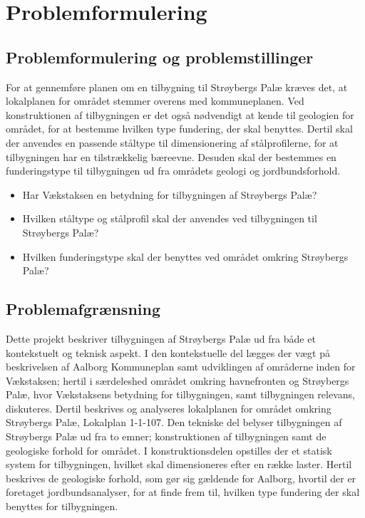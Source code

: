 \chapter{Problemformulering}

\section{Problemformulering og problemstillinger}
For at gennemføre planen om en tilbygning til Strøybergs Palæ kræves det, at lokalplanen for området stemmer overens med kommuneplanen. Ved konstruktionen af tilbygningen er det også nødvendigt at kende til geologien for området, for at bestemme hvilken type fundering, der skal benyttes. Dertil skal der anvendes en passende ståltype til dimensionering af stålprofilerne, for at tilbygningen har en tilstrækkelig bæreevne. Desuden skal der bestemmes en funderingstype til tilbygningen ud fra områdets geologi og jordbundsforhold. 

\begin{itemize} 
	\item Har Vækstaksen en betydning for tilbygningen af Strøybergs Palæ?
	\item Hvilken ståltype og stålprofil skal der anvendes ved tilbygningen til Strøybergs Palæ? 
	\item Hvilken funderingstype skal der benyttes ved området omkring Strøybergs Palæ? 
\end{itemize} 

\section{Problemafgrænsning}
Dette projekt beskriver tilbygningen af Strøybergs Palæ ud fra både et kontekstuelt og teknisk aspekt. I den kontekstuelle del lægges der vægt på beskrivelsen af Aalborg Kommuneplan samt udviklingen af områderne inden for Vækstaksen; hertil i særdeleshed området omkring havnefronten og Strøybergs Palæ, hvor Vækstaksens betydning for tilbygningen, samt tilbygningen relevans, diskuteres. Dertil beskrives og analyseres lokalplanen for området omkring Strøybergs Palæ, Lokalplan 1-1-107.
\newline \indent{     }  Den tekniske del belyser tilbygningen af Strøybergs Palæ ud fra to emner; konstruktionen af tilbygningen samt de geologiske forhold for området. I konstruktionsdelen opstilles der et statisk system for tilbygningen, hvilket skal dimensioneres efter en række laster. 
\newline \indent{     }  Hertil beskrives de geologiske forhold, som gør sig gældende for Aalborg, hvortil der er foretaget jordbundsanalyser, for at finde frem til, hvilken type fundering der skal benyttes for tilbygningen.  